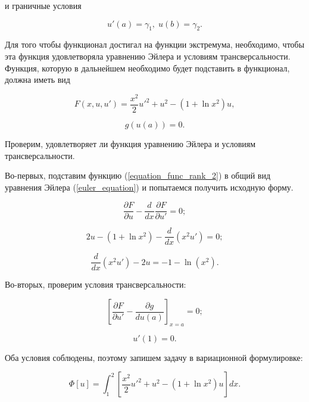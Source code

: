 \noindent и граничные условия

\begin{displaymath}
	u'(a) = \gamma_{1}, \; u(b) = \gamma_{2}.
\end{displaymath}

Для того чтобы функционал достигал на функции экстремума, необходимо, чтобы эта функция удовлетворяла уравнению Эйлера и условиям трансверсальности. Функция, которую в дальнейшем необходимо будет подставить в функционал, должна иметь вид

\begin{equation}\label{equation_func_rank_2}
	F(x, u, u') = \frac{x^2}{2}u'^2 + u^2 - (1+\ln{x^2})u,
\end{equation}

\begin{displaymath}
	g(u(a)) = 0.
\end{displaymath}

\noindent Проверим, удовлетворяет ли функция уравнению Эйлера и условиям трансверсальности. 

Во-первых, подставим функцию (\ref{equation_func_rank_2}) в общий вид уравнения Эйлера (\ref{euler_equation}) и попытаемся получить исходную форму.

\begin{displaymath}
	\frac{\partial F}{\partial u} - \frac{d}{dx}\frac{\partial F}{\partial u'} = 0;
\end{displaymath}

\begin{displaymath}
	2u - (1 + \ln{x^2}) - \frac{d}{dx}(x^2 u') = 0;
\end{displaymath}

\begin{displaymath}
	\frac{d}{dx}(x^2 u') - 2u = -1 - \ln(x^2).
\end{displaymath}

\noindent Во-вторых, проверим условия трансверсальности:

\begin{displaymath}
	\left[ \frac{\partial F}{\partial u'} - \frac{\partial g}{du(a)} \right]_{x=a} = 0;
\end{displaymath}

\begin{displaymath}
	u'(1) = 0.
\end{displaymath}

\noindent Оба условия соблюдены, поэтому запишем задачу в вариационной формулировке:

\begin{equation}\label{equation_functional_rank_2}
	\Phi[u] = \int_{1}^{2} \left[ \frac{x^2}{2}u'^2 + u^2 - (1 + \ln{x^2})u \right] dx.
\end{equation}

